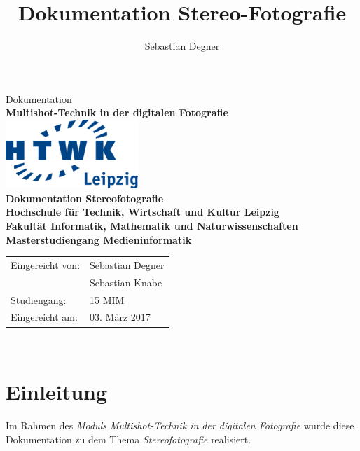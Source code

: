 \documentclass[liststotoc,bibtotoc,fontsize=14pt,]{scrreprt}
\title{Dokumentation Stereo-Fotografie}
\author{Sebastian Degner}
\begin{document}
	
	\begin{titlepage}
		\begin{center}
			\vspace{2cm}
			Dokumentation\\ \textbf{Multishot-Technik in der digitalen Fotografie}\\ 
			\vspace{2,5cm}
			\includegraphics[width=5cm]{HTWK_Logo_RGB-transparent_250.png}\\
			
			\vspace{2,5cm}
			\huge \textbf{\textsf{Dokumentation Stereofotografie}} \\
			\vspace{3cm}
			\fontsize{15}{18} \textbf{Hochschule für Technik, Wirtschaft und Kultur
				Leipzig\\ Fakultät Informatik, Mathematik und Naturwissenschaften\\   Masterstudiengang Medieninformatik}\\
			\vspace{3cm}
		\end{center}
		\normalsize{
			\begin{tabular}{ll}
				Eingereicht von: & {Sebastian Degner} \\
				 & {Sebastian Knabe} \\
				Studiengang: & 15 MIM\\
				Eingereicht am: & 03. März 2017 \\
			\end{tabular}\\
		}
		
	\end{titlepage}
	
	\tableofcontents
	\clearpage
	\listoffigures

	\chapter{Einleitung}
	\label{ch:einleitung}
	Im Rahmen des \textit{Moduls Multishot-Technik in der digitalen Fotografie} wurde diese Dokumentation zu dem Thema \textit{Stereofotografie} realisiert. 
	
\end{document}
